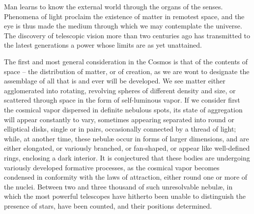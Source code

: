 Man learns to know the external world through the organs of the senses. Phenomena of light proclaim the existence of matter in remotest space, and the eye is thus made the medium through which we may contemplate the universe. The discovery of telescopic vision more than two centuries ago has transmitted to the latest generations a power whose limits are as yet unattained. 

The first and most general consideration in the Cosmos is that of the contents of space -- the distribution of matter, or of creation, as we are wont to designate the assemblage of all that is and ever will be developed. We see matter either agglomerated into rotating, revolving spheres of different density and size, or scattered through space in the form of self-luminous vapor. If we consider first the cosmical vapor dispersed in definite nebulous spots, its state of aggregation will appear constantly to vary, sometimes appearing separated into round or elliptical disks, single or in pairs, occasionally connected by a thread of light; while, at another time, these nebul{\ae} occur in forms of larger dimensions, and are either elongated, or variously branched, or fan-shaped, or appear like well-defined rings, enclosing a dark interior. It is conjectured that these bodies are undergoing variously developed formative processes, as the cosmical vapor becomes condensed in conformity with the laws of attraction, either round one or more of the nuclei. Between two and three thousand of such unresolvable nebul{\ae}, in which the most powerful telescopes have hitherto been unable to distinguish the presence of stars, have been counted, and their positions determined.

